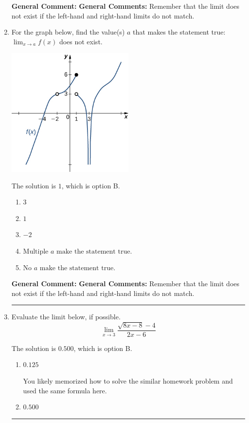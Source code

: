 \documentclass{extbook}[14pt]
\newcommand{\litem}[1]{\item #1

\rule{\textwidth}{0.4pt}}
\begin{document}
\begin{enumerate}
{\textbf{General Comment:} \textbf{General Comments:} Remember that the limit does not exist if the left-hand and right-hand limits do not match.
}
\litem{
For the graph below, find the value(s) $a$ that makes the statement true: $ \displaystyle \lim_{x \rightarrow a} f(x)$ does not exist.

\begin{center}
    \includegraphics[width=0.5\textwidth]{../Figures/evaluateLimitGraphicallyB.png}
\end{center}




The solution is \( 1 \), which is option B.\begin{enumerate}[label=\Alph*.]
\item \( 3 \)


\item \( 1 \)


\item \( -2 \)


\item \( \text{Multiple } a \text{ make the statement true}. \)


\item \( \text{No } a \text{ make the statement true}. \)


\end{enumerate}

\textbf{General Comment:} \textbf{General Comments:} Remember that the limit does not exist if the left-hand and right-hand limits do not match.
}
\litem{
Evaluate the limit below, if possible.
\[ \lim_{x \rightarrow 3} \frac{\sqrt{8x - 8} - 4}{2x - 6} \]

The solution is \( 0.500 \), which is option B.\begin{enumerate}[label=\Alph*.]
\item \( 0.125 \)

You likely memorized how to solve the similar homework problem and used the same formula here.
\item \( 0.500 \)


\end{enumerate}}
\end{enumerate}
\end{document}
